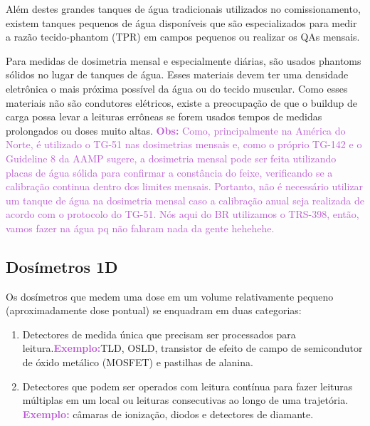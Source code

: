 \documentclass[11pt,a4paper]{article}
\begin{document}
	Além destes grandes tanques de água tradicionais utilizados no comissionamento, existem  tanques pequenos de água disponíveis que são especializados para medir a razão tecido-phantom (TPR) em campos pequenos ou realizar os QAs mensais.

	Para medidas de dosimetria mensal e especialmente diárias, são usados phantoms sólidos no lugar de tanques de água. Esses materiais devem ter uma densidade eletrônica o mais próxima possível da água ou do tecido muscular. Como esses materiais não são condutores elétricos, existe a preocupação de que o buildup de carga possa levar a leituras errôneas se forem usados tempos de medidas prolongados ou doses muito altas. \textcolor{MediumOrchid}{\textbf{Obs:} Como, principalmente na América do Norte, é utilizado o TG-51 nas dosimetrias mensais e, como o próprio TG-142 e o Guideline 8 da AAMP sugere, a dosimetria mensal pode ser feita utilizando placas de água sólida para confirmar a constância do feixe, verificando se a calibração continua dentro dos limites mensais.  Portanto, não é necessário utilizar um tanque de água na dosimetria mensal caso a calibração anual seja realizada de acordo com o protocolo do TG-51. Nós aqui do BR utilizamos o TRS-398, então, vamos fazer na água pq não falaram nada da gente hehehehe.}

\subsection{Dosímetros 1D}

	Os dosímetros que medem uma dose em um volume relativamente pequeno (aproximadamente dose pontual) se enquadram em duas categorias:

	\begin{enumerate}
		\item Detectores de medida única que precisam ser processados para leitura.\textcolor{MediumOrchid}{\textbf{Exemplo:}}TLD, OSLD, transistor de efeito de campo de semicondutor de óxido metálico (MOSFET) e pastilhas de alanina. 
		\item Detectores que podem ser operados com leitura contínua para fazer leituras múltiplas em um local ou leituras consecutivas ao longo de uma trajetória. \textcolor{MediumOrchid}{\textbf{Exemplo:}} câmaras de ionização, diodos e detectores de diamante.
	\end{enumerate}
\end{document}
